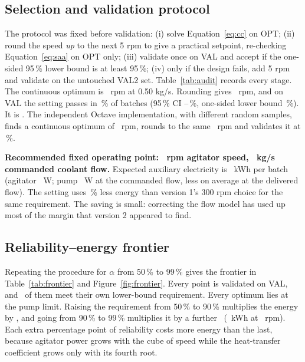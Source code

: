 \documentclass[11pt,letterpaper]{article}
\begin{document}
\subsection{Selection and validation protocol}
The protocol was fixed before validation: (i) solve Equation~\ref{eq:cc} on OPT; (ii) round the speed \emph{up} to the next 5 rpm to give a practical setpoint, re-checking Equation~\ref{eq:saa} on OPT only; (iii) validate once on VAL and accept if the one-sided 95\,\% lower bound is at least 95\,\%; (iv) only if the design fails, add 5 rpm and validate on the untouched VAL2 set. Table~\ref{tab:audit} records every stage. The continuous optimum is \vCCRpm\ rpm at 0.50 kg/s. Rounding gives \vRecRpm\ rpm, and on VAL the setting passes in \vRecPass\,\% of batches (95\,\% CI \vRecLo--\vRecHi\,\%, one-sided lower bound \vRecLB\,\%). It is \vRecValStage. The independent Octave implementation, with different random samples, finds a continuous optimum of \vOctCCRpm\ rpm, rounds to the same \vRecRpm\ rpm and validates it at \vOctRecPass\,\%.

\begin{table}[H]
\centering
\caption{Audit trail of the recommended fixed setting.}\label{tab:audit}
{\small}
\end{table}

\textbf{Recommended fixed operating point: \vRecRpm\ rpm agitator speed, \vRecM\ kg/s commanded coolant flow.} Expected auxiliary electricity is \vRecE\ kWh per batch (agitator \vRecAgW\ W; pump \vRecPumpW\ W at the commanded flow, less on average at the delivered flow). The setting uses \vRecVsVOne\,\% less energy than version 1's 300 rpm choice for the same requirement. The saving is small: correcting the flow model has used up most of the margin that version 2 appeared to find.

\subsection{Reliability--energy frontier}
Repeating the procedure for \(\alpha\) from 50\,\% to 99\,\% gives the frontier in Table~\ref{tab:frontier} and Figure~\ref{fig:frontier}. Every point is validated on VAL, and \vFrAllAccepted\ of them meet their own lower-bound requirement. Every optimum lies at the pump limit. Raising the requirement from 50\,\% to 90\,\% multiplies the energy by \vFrRatioA, and going from 90\,\% to 99\,\% multiplies it by a further \vFrRatioB\ (\vFrNinetyNineE\ kWh at \vFrNinetyNineRpm\ rpm). Each extra percentage point of reliability costs more energy than the last, because agitator power grows with the cube of speed while the heat-transfer coefficient grows only with its fourth root.
\end{document}

